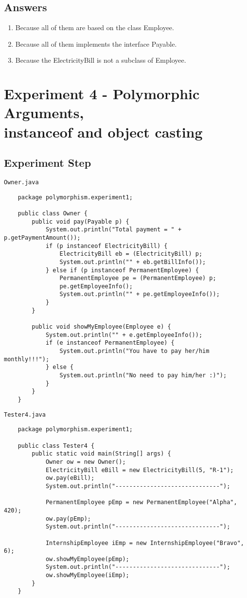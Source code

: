 \documentclass[12pt,titlepage]{article}
\begin{document}
\subsection{Answers}
\begin{enumerate}
    \item Because all of them are based on the class Employee.
    \item Because all of them implements the interface Payable.
    \item Because the ElectricityBill is not a subclass of Employee.
\end{enumerate}

\section{Experiment 4 - Polymorphic Arguments, \\ instanceof and object casting}
\subsection{Experiment Step}
\texttt{Owner.java}
\begin{verbatim}
    package polymorphism.experiment1;

    public class Owner {
        public void pay(Payable p) {
            System.out.println("Total payment = " + p.getPaymentAmount());
            if (p instanceof ElectricityBill) {
                ElectricityBill eb = (ElectricityBill) p;
                System.out.println("" + eb.getBillInfo());
            } else if (p instanceof PermanentEmployee) {
                PermanentEmployee pe = (PermanentEmployee) p;
                pe.getEmployeeInfo();
                System.out.println("" + pe.getEmployeeInfo());
            }
        }

        public void showMyEmployee(Employee e) {
            System.out.println("" + e.getEmployeeInfo());
            if (e instanceof PermanentEmployee) {
                System.out.println("You have to pay her/him monthly!!!");
            } else {
                System.out.println("No need to pay him/her :)");
            }
        }
    }
\end{verbatim}

\texttt{Tester4.java}
\begin{verbatim}
    package polymorphism.experiment1;

    public class Tester4 {
        public static void main(String[] args) {
            Owner ow = new Owner();
            ElectricityBill eBill = new ElectricityBill(5, "R-1");
            ow.pay(eBill);
            System.out.println("------------------------------");
            
            PermanentEmployee pEmp = new PermanentEmployee("Alpha", 420);
            ow.pay(pEmp);
            System.out.println("------------------------------");
            
            InternshipEmployee iEmp = new InternshipEmployee("Bravo", 6);
            ow.showMyEmployee(pEmp);
            System.out.println("------------------------------");
            ow.showMyEmployee(iEmp);
        }
    }
\end{verbatim}
\end{document}
